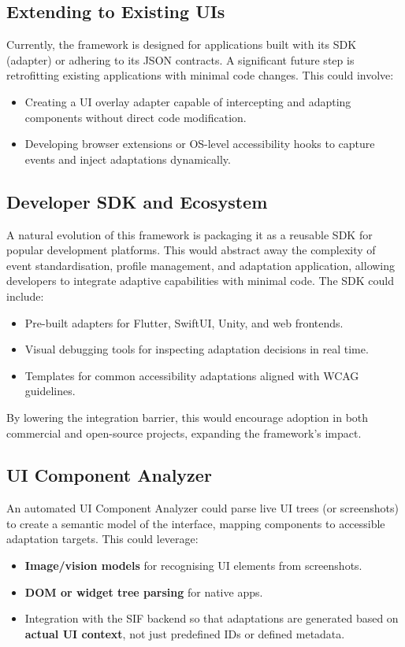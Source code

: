 \documentclass[openany]{book}
\begin{document}
\subsection{Extending to Existing UIs}
Currently, the framework is designed for applications built with its SDK (adapter) or adhering to its JSON contracts. A significant future step is retrofitting existing applications with minimal code changes. This could involve:
\begin{itemize}
    \item Creating a UI overlay adapter capable of intercepting and adapting components without direct code modification.
    \item Developing browser extensions or OS-level accessibility hooks to capture events and inject adaptations dynamically.
\end{itemize}

\subsection{Developer SDK and Ecosystem}
A natural evolution of this framework is packaging it as a reusable SDK for popular development platforms. This would abstract away the complexity of event standardisation, profile management, and adaptation application, allowing developers to integrate adaptive capabilities with minimal code. The SDK could include:
\begin{itemize}
    \item Pre-built adapters for Flutter, SwiftUI, Unity, and web frontends.
    \item Visual debugging tools for inspecting adaptation decisions in real time.
    \item Templates for common accessibility adaptations aligned with WCAG guidelines.
\end{itemize}
By lowering the integration barrier, this would encourage adoption in both commercial and open-source projects, expanding the framework’s impact.

\subsection{UI Component Analyzer}
An automated UI Component Analyzer could parse live UI trees (or screenshots) to create a semantic model of the interface, mapping components to accessible adaptation targets. This could leverage:
\begin{itemize}
    \item \textbf{Image/vision models} for recognising UI elements from screenshots.
    \item \textbf{DOM or widget tree parsing} for native apps.
    \item Integration with the SIF backend so that adaptations are generated based on \textbf{actual UI context}, not just predefined IDs or defined metadata.
\end{itemize}
\end{document}
